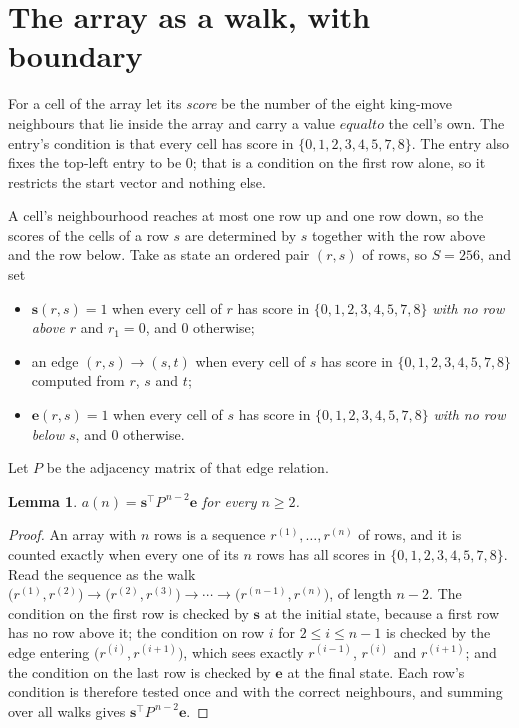 \documentclass[11pt,a4paper]{article}
\theoremstyle{plain}
\newtheorem{lemma}[theorem]{Lemma}
\theoremstyle{definition}
\begin{document}
\section{The array as a walk, with boundary}

For a cell of the array let its \emph{score} be the number of the eight king-move neighbours that lie inside
the array and carry a value $equal to$ the cell's own. The entry's condition is that every cell
has score in $\{0,1,2,3,4,5,7,8\}$. The entry also fixes the top-left entry to be $0$; that is a condition on the first row alone, so it restricts the start vector and nothing else.

A cell's neighbourhood reaches at most one row up and one row down, so the scores of the
cells of a row $s$ are determined by $s$ together with the row above and the row below.
Take as state an ordered pair $(r,s)$ of rows, so $S=256$, and set
\begin{itemize}
\item $\mathbf{s}(r,s)=1$ when every cell of $r$ has score in $\{0,1,2,3,4,5,7,8\}$ \emph{with no row
above $r$} and $r_1=0$, and $0$ otherwise;
\item an edge $(r,s)\to(s,t)$ when every cell of $s$ has score in $\{0,1,2,3,4,5,7,8\}$ computed from
$r$, $s$ and $t$;
\item $\mathbf{e}(r,s)=1$ when every cell of $s$ has score in $\{0,1,2,3,4,5,7,8\}$ \emph{with no row
below $s$}, and $0$ otherwise.
\end{itemize}
Let $P$ be the adjacency matrix of that edge relation.

\begin{lemma}\label{lem:walk}
$a(n)=\mathbf{s}^{\!\top}P^{\,n-2}\mathbf{e}$ for every $n\ge2$.
\end{lemma}

\begin{proof}
An array with $n$ rows is a sequence $r^{(1)},\dots,r^{(n)}$ of rows, and it is counted
exactly when every one of its $n$ rows has all scores in $\{0,1,2,3,4,5,7,8\}$. Read the sequence as the
walk $\bigl(r^{(1)},r^{(2)}\bigr)\to\bigl(r^{(2)},r^{(3)}\bigr)\to\cdots\to
\bigl(r^{(n-1)},r^{(n)}\bigr)$, of length $n-2$. The condition on the first row is
checked by $\mathbf{s}$ at the initial state, because a first row has no row above it; the
condition on row $i$ for $2\le i\le n-1$ is checked by the edge entering
$\bigl(r^{(i)},r^{(i+1)}\bigr)$, which sees exactly $r^{(i-1)}$, $r^{(i)}$ and
$r^{(i+1)}$; and the condition on the last row is checked by $\mathbf{e}$ at the final
state. Each row's condition is therefore tested once and with the correct neighbours, and
summing over all walks gives $\mathbf{s}^{\!\top}P^{\,n-2}\mathbf{e}$.
\end{proof}
\end{document}
